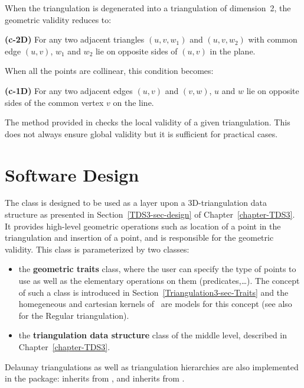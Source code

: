 When the triangulation is degenerated into a triangulation of
dimension~2, the  geometric validity reduces to:

{\bf (c-2D)} For any two adjacent triangles $(u,v,w_1)$ and $(u,v,w_2)$ with
common edge $(u,v)$, $w_1$ and $w_2$ lie on opposite sides of $(u,v)$
in the plane.

When all the points are collinear, this condition becomes:

{\bf (c-1D)} For any two adjacent edges $(u,v)$ and $(v,w)$, $u$ and
$w$ lie on opposite sides of the common vertex $v$ on the line.

The  method provided in  checks
the local validity of a given triangulation. This does not always
ensure global validity \cite{mnssssu-cgpvg-96,dlpt-ccpps-98} but it is 
sufficient for practical cases.

\section{Software Design}
\label{Triangulation3-sec-design}

The class  is
designed to be used as  
a layer upon a 3D-triangulation data structure as presented in 
Section~\ref{TDS3-sec-design} of Chapter~\ref{chapter-TDS3}.
It provides high-level geometric operations such as location of a point
in the triangulation and insertion of a point, and is responsible for
the geometric validity. This class is parameterized by two classes:
\begin{itemize}
\item {} the \textbf{geometric traits} class, where the user can
specify the type of points to use as well as the elementary
operations on them (predicates,\ldots). The concept of such a class is
introduced in Section~\ref{Triangulation3-sec-Traits} and the homegeneous and cartesian
kernels of \cgal\ are models for this concept
(see also  
for the Regular triangulation).
\item {} the \textbf{triangulation data structure} class of the middle level, 
described in Chapter~\ref{chapter-TDS3}.
\end{itemize}	

Delaunay triangulations as well as triangulation hierarchies
\cite{d-iirdt-98} are also implemented in the package: 
inherits from  
, and 
 inherits from .

